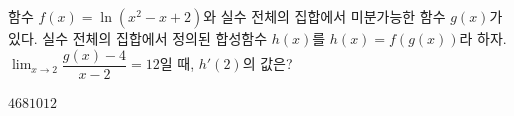 함수 $f(x)=\ln(x^2-x+2)$와 실수 전체의 집합에서 미분가능한 함수 $g(x)$가 있다. 실수 전체의 집합에서 정의된 합성함수 $h(x)$를 $h(x)=f(g(x))$라 하자. $\displaystyle\lim_{x\to 2}\dfrac{g(x)-4}{x-2}=12$일 때, $h'(2)$의 값은?
\begin{choices32}{$4$}{$6$}{$8$}{$10$}{$12$}\end{choices32}
